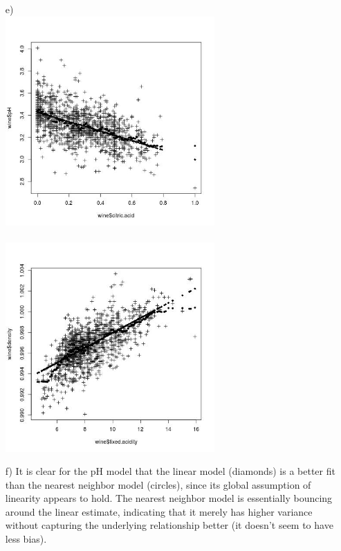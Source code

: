 \documentclass[11pt]{article}
\theoremstyle{definition}
\begin{document}
\begin{enumerate}
\begin{enumerate}
            \item[e)]
                \\ \includegraphics[width=8cm]{hw1_4e_phfit} \\
                \\ \includegraphics[width=8cm]{hw1_4e_denfit} \\
            \item[f)]
                It is clear for the pH model that the linear model (diamonds) is a better fit than the nearest neighbor model (circles), since its global  assumption of linearity appears to hold. The nearest neighbor model is essentially bouncing around the linear estimate, indicating that it merely has higher variance without capturing the underlying relationship better (it doesn't seem to have less bias). \\
 

\end{enumerate}
\end{enumerate}
\end{document}
